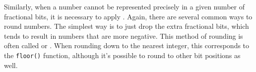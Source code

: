 Similarly, when a number cannot be represented precisely in a given number of fractional bits, it is necessary to apply .  Again, there are several common ways to round numbers.  The simplest way is to just drop the extra fractional bits, which tends to result in numbers that are more negative.  This method of rounding is often called  or .  When rounding down to the nearest integer, this corresponds to the \lstinline|floor()| function, although it's possible to round to other bit positions as well.
\tabspace\\

